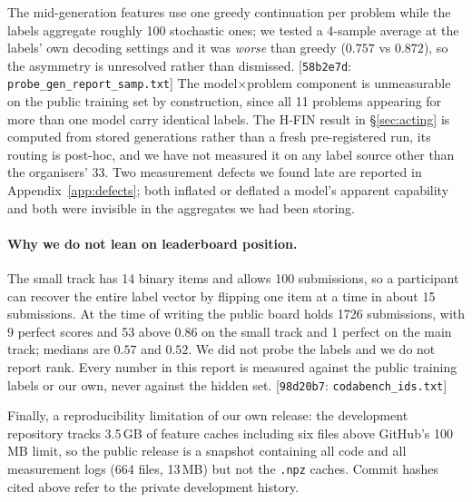 \documentclass[10pt]{article}
\newcommand{\cmt}[2]{{\footnotesize\textsf{[}\texttt{#1}\textsf{:} #2\textsf{]}}}
\begin{document}
The mid-generation features use one greedy continuation per problem while the labels aggregate
roughly 100 stochastic ones; we tested a 4-sample average at the labels' own decoding settings and it
was \emph{worse} than greedy ($0.757$ vs $0.872$), so the asymmetry is unresolved rather than
dismissed. \cmt{58b2e7d}{\texttt{probe\_gen\_report\_samp.txt}} The model$\times$problem component is
unmeasurable on the public training set by construction, since all 11 problems appearing for more
than one model carry identical labels. The H-FIN result in \S\ref{sec:acting} is computed from stored
generations rather than a fresh pre-registered run, its routing is post-hoc, and we have not measured
it on any label source other than the organisers' 33. Two measurement defects we found late are
reported in Appendix~\ref{app:defects}; both inflated or deflated a model's apparent capability and
both were invisible in the aggregates we had been storing.

\paragraph{Why we do not lean on leaderboard position.} The small track has 14 binary items and
allows 100 submissions, so a participant can recover the entire label vector by flipping one item at
a time in about 15 submissions. At the time of writing the public board holds 1726 submissions, with
9 perfect scores and 53 above $0.86$ on the small track and 1 perfect on the main track; medians are
$0.57$ and $0.52$. We did not probe the labels and we do not report rank. Every number in this report
is measured against the public training labels or our own, never against the hidden set.
\cmt{98d20b7}{\texttt{codabench\_ids.txt}}

Finally, a reproducibility limitation of our own release: the development repository tracks 3.5\,GB
of feature caches including six files above GitHub's 100\,MB limit, so the public release is a
snapshot containing all code and all measurement logs (664 files, 13\,MB) but not the \texttt{.npz}
caches. Commit hashes cited above refer to the private development history.
\end{document}
